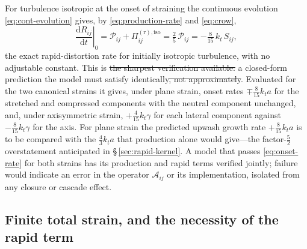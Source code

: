 \documentclass[lineno]{JFM-FLM_Au}
\providecommand{\DIFdel}[1]{{\protect\color{red}\sout{#1}}} %
\providecommand{\DIFdelbegin}{} %
\providecommand{\DIFdelend}{} %
\begin{document}
For turbulence isotropic at the onset of straining the continuous
evolution \eqref{eq:cont-evolution} gives, by
\eqref{eq:production-rate} and \eqref{eq:crow},
\begin{equation}
  \left.\frac{\mathrm{d}R_{ij}}{\mathrm{d}t}\right|_{0}
  = \mathcal{P}_{ij}+\Pi^{(\mathrm r),\mathrm{iso}}_{ij}
  = \tfrac{2}{5}\,\mathcal{P}_{ij}
  = -\tfrac{8}{15}\,k_t\,S_{ij},
  \label{eq:onset-rate}
\end{equation}
the exact rapid-distortion rate for initially isotropic turbulence, with
no adjustable constant. This is \DIFdelbegin \DIFdel{the sharpest verification available: }\DIFdelend a closed-form prediction the model must satisfy identically\DIFdelbegin \DIFdel{, not
approximately}\DIFdelend . Evaluated for the two canonical strains it gives, under
plane strain, onset rates $\mp\tfrac{8}{15}k_ta$ for the stretched and
compressed components with the neutral component unchanged, and, under
axisymmetric strain, $+\tfrac{4}{15}k_t\gamma$ for each lateral
component against $-\tfrac{8}{15}k_t\gamma$ for the axis. For plane
strain the predicted upwash growth rate $+\tfrac{8}{15}k_ta$ is to be
compared with the $\tfrac43k_ta$ that production alone would give---the
factor-$\tfrac52$ overstatement anticipated in
\S\,\ref{sec:rapid-kernel}. A model that passes \eqref{eq:onset-rate}
for both strains has its production and rapid terms verified jointly;
failure would indicate an error in the operator $\mathcal{A}_{ij}$ or
its implementation, isolated from any closure or cascade effect.

\subsection{Finite total strain, and the necessity of the rapid term}
\label{sec:finite-strain}
\end{document}
